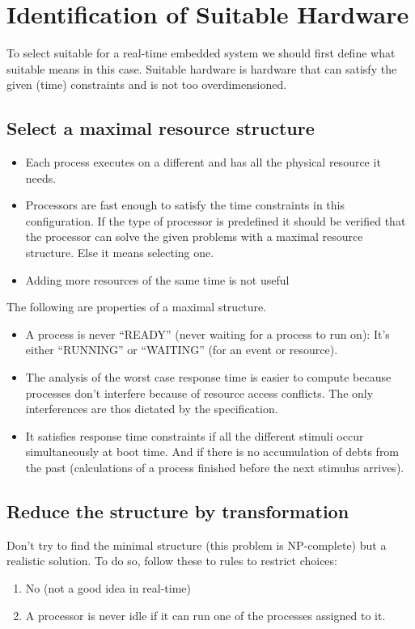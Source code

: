 \documentclass[../main.tex]{subfiles}
\begin{document}
\chapter{Identification of Suitable Hardware}
To select suitable  for a real-time embedded system we should first define what suitable means in this case. Suitable hardware is hardware that can satisfy the given (time) constraints and is not too overdimensioned.

\section{Select a maximal resource structure}

\begin{itemize}
	\item Each process executes on a different  and has all the physical resource it needs.
	\item Processors are fast enough to satisfy the time constraints in this configuration. If the type of processor is predefined it should be verified that the processor can solve the given problems with a maximal resource structure. Else it means selecting one.
	\item Adding more resources of the same time is not useful
\end{itemize}

The following are properties of a maximal  structure.
\begin{itemize}
	\item A process is never ``READY'' (never waiting for a process to run on): It's either ``RUNNING'' or ``WAITING'' (for an event or resource).
	\item The analysis of the worst case response time is easier to compute because processes don't interfere because of resource access conflicts. The only interferences are thos dictated by the specification.
	\item It satisfies response time constraints if all the different stimuli occur simultaneously at boot time. And if there is no accumulation of debts from the past (calculations of a process finished before the next stimulus arrives).
\end{itemize}

\section{Reduce the structure by transformation}
Don't try to find the minimal structure (this problem is NP-complete) but a realistic solution. To do so, follow these to rules to restrict choices:
\begin{enumerate}
	\item No  (not a good idea in real-time)
	\item A processor is never idle if it can run one of the processes assigned to it.
\end{enumerate}
\end{document}
